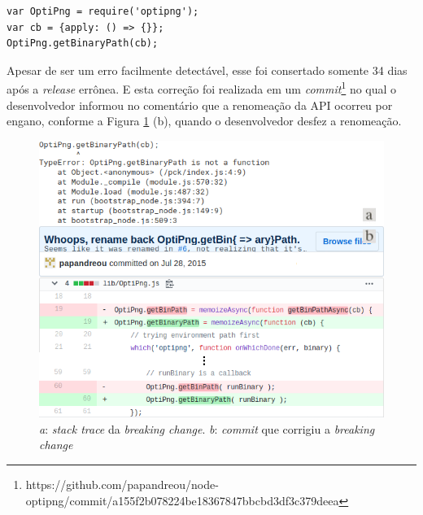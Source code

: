\begin{lstlisting}[style=Javascript, label=cod:bc:optipng, caption={Código que sofre \textit{breaking change} do \textit{optipng}}]
var OptiPng = require('optipng');
var cb = {apply: () => {}};
OptiPng.getBinaryPath(cb);
\end{lstlisting}

Apesar de ser um erro facilmente detectável, esse foi consertado somente 34 dias após a \textit{release} errônea. E esta correção foi realizada em um \textit{commit}\footnote{https://github.com/papandreou/node-optipng/commit/a155f2b078224be18367847bbcbd3df3c379deea} no qual o desenvolvedor informou no comentário que a renomeação da \gls{API} ocorreu por engano, conforme a Figura \ref{fig:bc_optipng} (b), quando o desenvolvedor desfez a renomeação.

\begin{figure}
    \centering
    \includegraphics[scale=0.65]{figuras/bc_optipng.png}
    \caption{\textit{a}: \textit{stack trace} da \textit{breaking change}. \textit{b}: \textit{commit} que corrigiu a \textit{breaking change}}
    \label{fig:bc_optipng}
\end{figure}{}